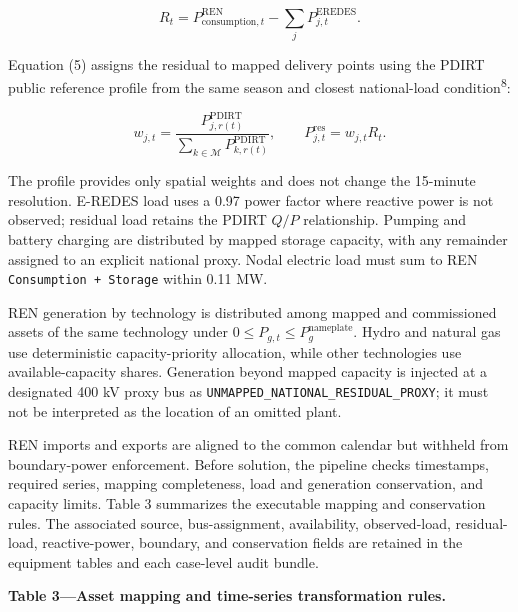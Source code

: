 \documentclass[
  10pt]{article}
\begin{document}
\[
R_t=P^{\mathrm{REN}}_{\mathrm{consumption},t}-\sum_j P^{\mathrm{EREDES}}_{j,t}. \tag{4}\label{eq:national-residual}
\]

Equation (5) assigns the residual to mapped delivery points using the
PDIRT public reference profile from the same season and closest
national-load condition\textsuperscript{8}:

\[
w_{j,t}=\frac{P^{\mathrm{PDIRT}}_{j,r(t)}}{\sum_{k\in\mathcal{M}}P^{\mathrm{PDIRT}}_{k,r(t)}},\qquad
P^{\mathrm{res}}_{j,t}=w_{j,t}R_t. \tag{5}\label{eq:residual-allocation}
\]

The profile provides only spatial weights and does not change the
15-minute resolution. E-REDES load uses a 0.97 power factor where
reactive power is not observed; residual load retains the PDIRT \(Q/P\)
relationship. Pumping and battery charging are distributed by mapped
storage capacity, with any remainder assigned to an explicit national
proxy. Nodal electric load must sum to REN
\texttt{Consumption\ +\ Storage} within 0.11 MW.

REN generation by technology is distributed among mapped and
commissioned assets of the same technology under
\(0\le P_{g,t}\le P_g^{\mathrm{nameplate}}\). Hydro and natural gas use
deterministic capacity-priority allocation, while other technologies use
available-capacity shares. Generation beyond mapped capacity is injected
at a designated 400 kV proxy bus as
\texttt{UNMAPPED\_NATIONAL\_RESIDUAL\_PROXY}; it must not be interpreted
as the location of an omitted plant.

REN imports and exports are aligned to the common calendar but withheld
from boundary-power enforcement. Before solution, the pipeline checks
timestamps, required series, mapping completeness, load and generation
conservation, and capacity limits. Table 3 summarizes the executable
mapping and conservation rules. The associated source, bus-assignment,
availability, observed-load, residual-load, reactive-power, boundary,
and conservation fields are retained in the equipment tables and each
case-level audit bundle.

\textbf{Table 3---Asset mapping and time-series transformation rules.}
\end{document}
